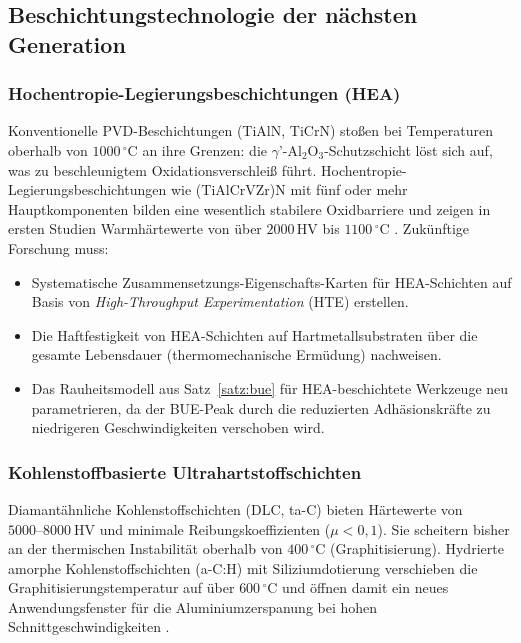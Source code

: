 ﻿\documentclass[a4paper,12pt]{article}
\theoremstyle{definition}
\begin{document}
\subsection{Beschichtungstechnologie der nächsten Generation}

\subsubsection{Hochentropie-Legierungsbeschichtungen (HEA)}

Konventionelle PVD-Beschichtungen (TiAlN, TiCrN) stoßen bei Temperaturen
oberhalb von $1000\,^{\circ}\mathrm{C}$ an ihre Grenzen: die $\gamma$'-Al$_2$O$_3$-Schutzschicht
löst sich auf, was zu beschleunigtem Oxidationsverschleiß führt.
Hochentropie-Legierungsbeschichtungen wie (TiAlCrVZr)N mit fünf oder mehr
Hauptkomponenten bilden eine wesentlich stabilere Oxidbarriere und zeigen
in ersten Studien Warmhärtewerte von über $2000\,\mathrm{HV}$ bis
$1100\,^{\circ}\mathrm{C}$ \cite{mu2018}. Zukünftige Forschung muss:

\begin{itemize}
  \item Systematische Zusammensetzungs-Eigenschafts-Karten für HEA-Schichten
        auf Basis von \emph{High-Throughput Experimentation} (HTE) erstellen.
  \item Die Haftfestigkeit von HEA-Schichten auf Hartmetallsubstraten über die
        gesamte Lebensdauer (thermomechanische Ermüdung) nachweisen.
  \item Das Rauheitsmodell aus Satz~\ref{satz:bue} für HEA-beschichtete
        Werkzeuge neu parametrieren, da der BUE-Peak durch die reduzierten
        Adhäsionskräfte zu niedrigeren Geschwindigkeiten verschoben wird.
\end{itemize}

\subsubsection{Kohlenstoffbasierte Ultrahartstoffschichten}

Diamantähnliche Kohlenstoffschichten (DLC, ta-C) bieten Härtewerte von
$5000\text{--}8000~\text{HV}$ und minimale Reibungskoeffizienten
($\mu < 0{,}1$). Sie scheitern bisher an der thermischen Instabilität
oberhalb von $400\,^{\circ}\mathrm{C}$ (Graphitisierung). Hydrierte amorphe
Kohlenstoffschichten (a-C:H) mit Siliziumdotierung verschieben die
Graphitisierungstemperatur auf über $600\,^{\circ}\mathrm{C}$ und öffnen damit
ein neues Anwendungsfenster für die Aluminiumzerspanung bei hohen
Schnittgeschwindigkeiten \cite{voevodin2005}.
\end{document}
